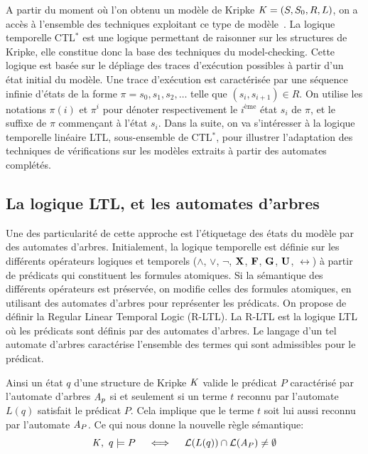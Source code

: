 A partir du moment où l'on obtenu un modèle de Kripke $\mathit K = (S, S_0,
R, L)$, on a accès à l'ensemble des techniques exploitant ce type de
modèle~\cite{MC-Book}. La logique temporelle CTL$^*$ est une logique permettant
de raisonner sur les structures de Kripke, elle constitue donc la base des techniques
du model-checking. Cette logique est basée sur le dépliage des traces
d'exécution possibles à partir d'un état initial du modèle. Une trace
d'exécution est caractérisée par une séquence infinie d'états de la
forme $\pi = s_0, s_1, s_2, \dots$ telle que $(s_i, s_{i+1}) \in
R$. On utilise les notations $\pi(i)$ et $\pi^i$ pour dénoter respectivement
le $i^\text{ème}$ état $s_i$ de $\pi$, et le suffixe de $\pi$ commençant à l'état $s_i$.
Dans la suite, on va s'intéresser à la logique temporelle linéaire LTL, sous-ensemble de CTL$^*$,
pour illustrer l'adaptation des techniques de vérifications sur les modèles extraits à partir 
des automates complétés.


\subsection{La logique LTL, et les automates d'arbres}

Une des particularité de cette approche est l'étiquetage des états du modèle par des automates d'arbres.
Initialement, la logique temporelle est définie sur les différents opérateurs logiques et temporels
($\land$, $\lor$, $\neg$, $\mathbf X$, $\mathbf F$, $\mathbf G$, $\mathbf U$, $\rel$) à partir de prédicats qui constituent 
les formules atomiques. Si la sémantique des différents opérateurs est préservée, on modifie celles des
formules atomiques, en utilisant des automates d'arbres pour représenter les prédicats.
On propose de définir la Regular Linear Temporal Logic (R-LTL). La R-LTL est la logique LTL où les prédicats sont définis par des
automates d'arbres. Le langage d'un tel automate d'arbres caractérise l'ensemble des termes qui sont admissibles pour le prédicat.

Ainsi un état $q$ d'une structure de Kripke $\mathit K$ valide le prédicat $P$ caractérisé
par l'automate d'arbres  $\mathit A_p$ si et seulement si un terme $t$ reconnu par l'automate
$L(q)$ satisfait le prédicat $P$. Cela implique que le terme $t$ soit lui aussi reconnu
par l'automate $\mathit A_P$. Ce qui nous donne la nouvelle règle sémantique:
\[\mathit K,\ q \models P\quad \; \Longleftrightarrow \;\quad \mathcal{L}{}(L(q)) \cap \mathcal{L}{}(\mathit A_P) \neq \emptyset\]

